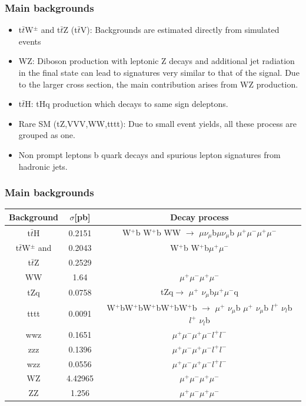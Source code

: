 \documentclass[11pt]{beamer}
\begin{document}
\begin{frame}
\frametitle{Main backgrounds}
\begin{itemize}
\item t$\bar{t}$W$^\pm$ and t$\bar{t}$Z (t$\bar{t}$V): Backgrounds are estimated directly from simulated events%
	\item WZ: Diboson production with leptonic Z decays and additional jet radiation in the final state can
	lead to signatures very similar to that of the signal. Due to the larger cross section, the main
	contribution arises from WZ production.
	\item t$\bar{t}$H: tHq production which decays to same sign deleptons.
\item Rare SM (tZ,VVV,WW,tttt): Due to small event yields, all these process are grouped as one.
\item Non prompt leptons b quark decays and spurious lepton signatures from hadronic jets.
\end{itemize}
\end{frame}

\begin{frame}
\frametitle{Main backgrounds}
\begin{tabular}{|c|c|c|}
	Background & $\sigma$[pb] & Decay process \\
	\hline
t$\bar{t}$H	& 0.2151 & W$^+$b W$^+$b WW $\rightarrow$ $\mu \nu_\mu$b$\mu \nu_\mu$b $\mu^+\mu^-$$\mu^+\mu^-$\\
\hline  
t$\bar{t}$W$^\pm$ and &0.2043 &  W$^+$b W$^+$b$\mu^+\mu^-$\\
\hline
 t$\bar{t}$Z & 0.2529 & \\
 \hline 
  WW  &1.64 & $\mu^+ \mu^- \mu^+ \mu^-$\\
    \hline 
  tZq  &0.0758 & tZq$\rightarrow$  $\mu^+$ $\nu_\mu$b$ \mu^+ \mu^-$q \\
    \hline 
  tttt  & 0.0091&W$^+$bW$^+$bW$^+$bW$^+$bW$^+$b $\rightarrow$  $\mu^+$ $\nu_\mu$b $\mu^+$ $\nu_\mu$b  $l^+$ $\nu_l$b $l^+$ $\nu_l$b \\
    \hline 
  wwz  & 0.1651& $\mu^+ \mu^- \mu^+ \mu^- l^+l^-$\\
    \hline 
  zzz  &0.1396 &$\mu^+ \mu^-\mu^+ \mu^- l^+l^- $  \\
    \hline 
  wzz  & 0.0556&$\mu^+ \mu^-\mu^+ \mu^-  l^+l^-$  \\
  \hline 
 WZ &4.42965 &$\mu^+ \mu^-\mu^+ \mu^-$ \\
 \hline
ZZ &  1.256 & $\mu^+ \mu^-\mu^+ \mu^-$ \\
 \hline
\end{tabular}


\end{frame}
\end{document}
